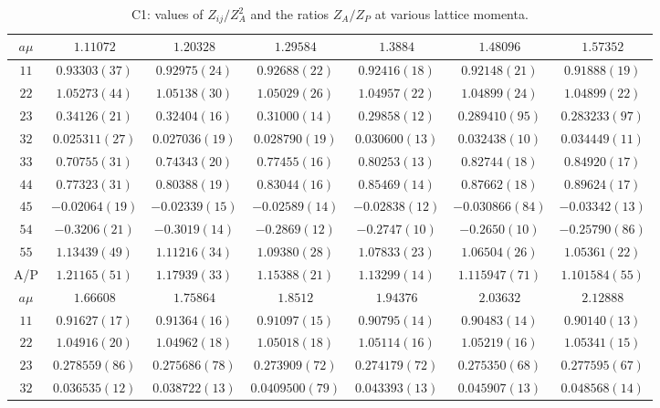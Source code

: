 \begin{table}
\begin{center}
\caption{C1: values of $Z_{ij}/Z_A^2$ and the ratios $Z_A/Z_P$ at various lattice momenta.}
\begin{tabular}{c|c c c c c c}
\hline
\hline
$a\mu$ & $1.11072$ & $1.20328$ & $1.29584$ & $1.3884$ & $1.48096$ & $1.57352$ \\
\hline
$11$ & $0.93303(37)$ & $0.92975(24)$ & $0.92688(22)$ & $0.92416(18)$ & $0.92148(21)$ & $0.91888(19)$ \\
$22$ & $1.05273(44)$ & $1.05138(30)$ & $1.05029(26)$ & $1.04957(22)$ & $1.04899(24)$ & $1.04899(22)$ \\
$23$ & $0.34126(21)$ & $0.32404(16)$ & $0.31000(14)$ & $0.29858(12)$ & $0.289410(95)$ & $0.283233(97)$ \\
$32$ & $0.025311(27)$ & $0.027036(19)$ & $0.028790(19)$ & $0.030600(13)$ & $0.032438(10)$ & $0.034449(11)$ \\
$33$ & $0.70755(31)$ & $0.74343(20)$ & $0.77455(16)$ & $0.80253(13)$ & $0.82744(18)$ & $0.84920(17)$ \\
$44$ & $0.77323(31)$ & $0.80388(19)$ & $0.83044(16)$ & $0.85469(14)$ & $0.87662(18)$ & $0.89624(17)$ \\
$45$ & $-0.02064(19)$ & $-0.02339(15)$ & $-0.02589(14)$ & $-0.02838(12)$ & $-0.030866(84)$ & $-0.03342(13)$ \\
$54$ & $-0.3206(21)$ & $-0.3019(14)$ & $-0.2869(12)$ & $-0.2747(10)$ & $-0.2650(10)$ & $-0.25790(86)$ \\
$55$ & $1.13439(49)$ & $1.11216(34)$ & $1.09380(28)$ & $1.07833(23)$ & $1.06504(26)$ & $1.05361(22)$ \\
\hline
A/P & $1.21165(51)$ & $1.17939(33)$ & $1.15388(21)$ & $1.13299(14)$ & $1.115947(71)$ & $1.101584(55)$ \\
\hline
$a\mu$ & $1.66608$ & $1.75864$ & $1.8512$ & $1.94376$ & $2.03632$ & $2.12888$ \\
\hline
$11$ & $0.91627(17)$ & $0.91364(16)$ & $0.91097(15)$ & $0.90795(14)$ & $0.90483(14)$ & $0.90140(13)$ \\
$22$ & $1.04916(20)$ & $1.04962(18)$ & $1.05018(18)$ & $1.05114(16)$ & $1.05219(16)$ & $1.05341(15)$ \\
$23$ & $0.278559(86)$ & $0.275686(78)$ & $0.273909(72)$ & $0.274179(72)$ & $0.275350(68)$ & $0.277595(67)$ \\
$32$ & $0.036535(12)$ & $0.038722(13)$ & $0.0409500(79)$ & $0.043393(13)$ & $0.045907(13)$ & $0.048568(14)$ \\

\end{tabular}
\end{center}
\end{table}
